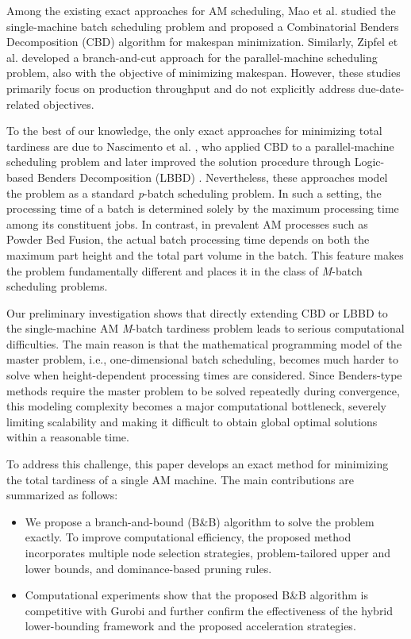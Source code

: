 \documentclass[letterpaper, 10 pt, conference]{ieeeconf}  %
\begin{document}
Among the existing exact approaches for AM scheduling, Mao et al. \cite{maoCombinatorialBendersDecomposition2024} studied the single-machine batch scheduling problem and proposed a Combinatorial Benders Decomposition (CBD) algorithm for makespan minimization. Similarly, Zipfel et al. \cite{zipfelNewBranchandcutApproach2024} developed a branch-and-cut approach for the parallel-machine scheduling problem, also with the objective of minimizing makespan. However, these studies primarily focus on production throughput and do not explicitly address due-date-related objectives.

To the best of our knowledge, the only exact approaches for minimizing total tardiness are due to Nascimento et al. \cite{nascimentoOptimalDecompositionApproach2024}, who applied CBD to a parallel-machine scheduling problem and later improved the solution procedure through Logic-based Benders Decomposition (LBBD) \cite{nascimentoImprovingEfficiencyLogicbased2026}. Nevertheless, these approaches model the problem as a standard \emph{p}-batch scheduling problem. In such a setting, the processing time of a batch is determined solely by the maximum processing time among its constituent jobs. In contrast, in prevalent AM processes such as Powder Bed Fusion, the actual batch processing time depends on both the maximum part height and the total part volume in the batch. This feature makes the problem fundamentally different and places it in the class of \emph{M}-batch scheduling problems.

Our preliminary investigation shows that directly extending CBD or LBBD to the single-machine AM \emph{M}-batch tardiness problem leads to serious computational difficulties. The main reason is that the mathematical programming model of the master problem, i.e., one-dimensional batch scheduling, becomes much harder to solve when height-dependent processing times are considered. Since Benders-type methods require the master problem to be solved repeatedly during convergence, this modeling complexity becomes a major computational bottleneck, severely limiting scalability and making it difficult to obtain global optimal solutions within a reasonable time.

To address this challenge, this paper develops an exact method for minimizing the total tardiness of a single AM machine. The main contributions are summarized as follows:
\begin{itemize}
    \item We propose a branch-and-bound (B\&B) algorithm to solve the problem exactly. To improve computational efficiency, the proposed method incorporates multiple node selection strategies, problem-tailored upper and lower bounds, and dominance-based pruning rules.
    \item Computational experiments show that the proposed B\&B algorithm is competitive with Gurobi and further confirm the effectiveness of the hybrid lower-bounding framework and the proposed acceleration strategies.
\end{itemize}
\end{document}
